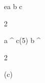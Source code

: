 \begin{eqcode}{e}{a }{}{}
  b \in {} \lend
  c \gets
  \begin{tmatrix}
  2  \lend
  \end{tmatrix} \lend
  a \gets \genar \limits ^ {c}(5) \lend %
  b \gets \genar \limits ^ {  \begin{tmatrix}
  2  \lend
  \end{tmatrix} }(c) \lend 
\end{eqcode}
